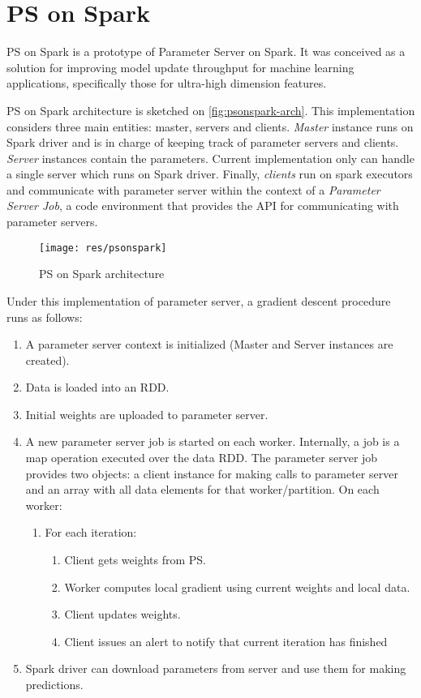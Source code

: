 \section*{PS on Spark}
\label{sec:psspark}
PS on Spark is a prototype of Parameter Server on Spark. It was conceived as a solution for improving model update throughput for machine learning applications, specifically those for ultra-high dimension features.

PS on Spark architecture is sketched on \autoref{fig:psonspark-arch}. This implementation considers three main entities: master, servers and clients. \textit{Master} instance runs on Spark driver and is in charge of keeping track of parameter servers and clients. \textit{Server} instances contain the parameters. Current implementation only can handle a single server which runs on Spark driver. Finally, \textit{clients} run on spark executors and communicate with parameter server within the context of a \textit{Parameter Server Job}, a code environment that provides the API for communicating with parameter servers.

\begin{figure}[!h]
  \centering
  \texttt{[image: res/psonspark]}
  \caption{PS on Spark architecture}
  \label{fig:psonspark-arch}
\end{figure}

Under this implementation of parameter server, a gradient descent procedure runs as follows:
\begin{enumerate}
  \item A parameter server context is initialized (Master and Server instances are created).
  \item Data is loaded into an RDD.
  \item Initial weights are uploaded to parameter server.
  \item A new parameter server job is started on each worker. Internally, a job is a map operation executed over the data RDD. The parameter server job provides two objects: a client instance for making calls to parameter server and an array with all data elements for that worker/partition. On each worker:
  \begin{enumerate}[label*=\arabic*.]
    \item For each iteration:
    \begin{enumerate}[label*=\arabic*.]
      \item Client gets weights from PS.
      \item Worker computes local gradient using current weights and local data.
      \item Client updates weights.
      \item Client issues an alert to notify that current iteration has finished
      \end{enumerate}
  \end{enumerate}
  \item Spark driver can download parameters from server and use them for making predictions.
\end{enumerate}

